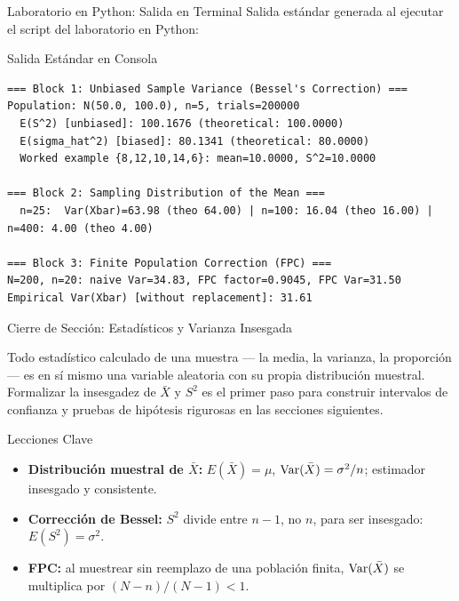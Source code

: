 \documentclass[10pt, aspectratio=169]{beamer}
\begin{document}
\begin{frame}[fragile]{Laboratorio en Python: Salida en Terminal}
  \scriptsize
  Salida estándar generada al ejecutar el script del laboratorio en Python:
  \vspace{0.02cm}
  \begin{block}{Salida Estándar en Consola}
    \fontsize{4pt}{5pt}\selectfont
    \begin{verbatim}
=== Block 1: Unbiased Sample Variance (Bessel's Correction) ===
Population: N(50.0, 100.0), n=5, trials=200000
  E(S^2) [unbiased]: 100.1676 (theoretical: 100.0000)
  E(sigma_hat^2) [biased]: 80.1341 (theoretical: 80.0000)
  Worked example {8,12,10,14,6}: mean=10.0000, S^2=10.0000

=== Block 2: Sampling Distribution of the Mean ===
  n=25:  Var(Xbar)=63.98 (theo 64.00) | n=100: 16.04 (theo 16.00) | n=400: 4.00 (theo 4.00)

=== Block 3: Finite Population Correction (FPC) ===
N=200, n=20: naive Var=34.83, FPC factor=0.9045, FPC Var=31.50
Empirical Var(Xbar) [without replacement]: 31.61
    \end{verbatim}
  \end{block}
\end{frame}

\begin{frame}{Cierre de Sección: Estadísticos y Varianza Insesgada}
  \begin{reflexion}
    Todo estadístico calculado de una muestra --- la media, la varianza, la proporción --- es en sí mismo una variable aleatoria con su propia distribución muestral. Formalizar la insesgadez de $\bar{X}$ y $S^2$ es el primer paso para construir intervalos de confianza y pruebas de hipótesis rigurosas en las secciones siguientes.
  \end{reflexion}

  \vspace{0.2cm}
  \pause
  \begin{block}{Lecciones Clave}
    \begin{itemize}\itemsep=0.08cm
      \item \textbf{Distribución muestral de $\bar{X}$:} $E(\bar{X})=\mu$, $\operatorname{Var}(\bar{X})=\sigma^2/n$; estimador insesgado y consistente.
      \item \textbf{Corrección de Bessel:} $S^2$ divide entre $n-1$, no $n$, para ser insesgado: $E(S^2)=\sigma^2$.
      \item \textbf{FPC:} al muestrear sin reemplazo de una población finita, $\operatorname{Var}(\bar{X})$ se multiplica por $(N-n)/(N-1) < 1$.
    \end{itemize}
  \end{block}
\end{frame}
\end{document}

